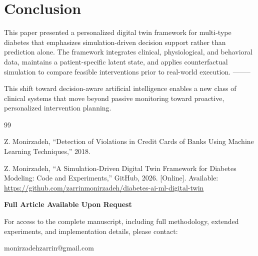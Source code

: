 \documentclass[journal]{IEEEtran}
\begin{document}
\section{Conclusion}
This paper presented a personalized digital twin framework for multi-type diabetes that emphasizes simulation-driven decision support rather than prediction alone. The framework integrates clinical, physiological, and behavioral data, maintains a patient-specific latent state, and applies counterfactual simulation to compare feasible interventions prior to real-world execution.
--------

This shift toward decision-aware artificial intelligence enables a new class of clinical systems that move beyond passive monitoring toward proactive, personalized intervention planning.

\begin{thebibliography}{99}

Z. Monirzadeh, “Detection of Violations in Credit Cards of Banks Using Machine Learning Techniques,” 2018.

Z. Monirzadeh, “A Simulation-Driven Digital Twin Framework for Diabetes Modeling: Code and Experiments,”
GitHub, 2026. [Online]. Available:
\url{https://github.com/zarrinmonirzadeh/diabetes-ai-ml-digital-twin}

\end{thebibliography}

\vspace{2em}

\begin{center}
{\Large \bfseries Full Article Available Upon Request}
\end{center}

\vspace{0.8em}

\begin{center}
{\normalsize
For access to the complete manuscript, including full methodology, extended experiments, and implementation details, please contact:}
\end{center}

\vspace{0.5em}

\begin{center}
{\large \ttfamily monirzadehzarrin@gmail.com}
\end{center}

\vspace{1em}
\end{document}
